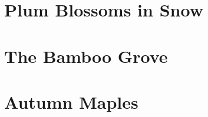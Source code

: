 \documentclass[11pt]{article}
\begin{document}
\section{Plum Blossoms in Snow}
\lipsum[1-4]
\section{The Bamboo Grove}
\lipsum[5-9]
\section{Autumn Maples}
\lipsum[10-14]
\end{document}
